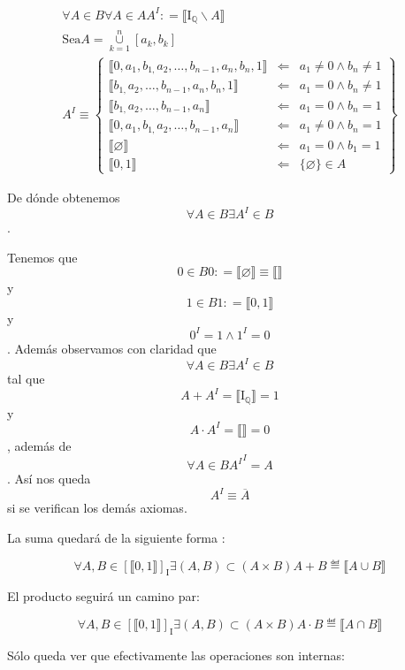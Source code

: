 \begin{enumerate}
  \[\begin{matrix}
  {\forall{A \in B}\forall{A \in A}A^{I}{: = {⟦{\mathbf{\mathrm{I}}_{\mathbb{Q}} \smallsetminus A}⟧}}} \\
  {\text{Sea}{A = \underset{k = 1}{\overset{n}{\cup}}}\left\lbrack {a_{k},b_{k}} \right\rbrack} \\
  {A^{I} \equiv \begin{Bmatrix}
  {⟦{{0,a_{1}},{b_{1,}a_{2}},\ldots,{b_{n - 1},a_{n}},{b_{n},1}}⟧} & \Leftarrow & {{a_{1} \neq {0 \land b_{n}}} \neq 1} \\
  {⟦{{b_{1,}a_{2}},\ldots,{b_{n - 1},a_{n}},{b_{n},1}}⟧} & \Leftarrow & {{a_{1} = {0 \land b_{n}}} \neq 1} \\
  {⟦{{b_{1,}a_{2}},\ldots,{b_{n - 1},a_{n}}}⟧} & \Leftarrow & {{a_{1} = {0 \land b_{n}}} = 1} \\
  {⟦{{0,a_{1}},{b_{1,}a_{2}},\ldots,{b_{n - 1},a_{n}}}⟧} & \Leftarrow & {{a_{1} \neq {0 \land b_{n}}} = 1} \\
  {⟦\varnothing ⟧} & \Leftarrow & {{a_{1} = {0 \land b_{1}}} = 1} \\
  {⟦0,1⟧} & \Leftarrow & {{\{\varnothing\}} \in A}
  \end{Bmatrix}}
  \end{matrix}\]

  De dónde obtenemos\[\forall{A \in B}\exists{A^{I} \in B}\].

  Tenemos que \[{0 \in B}0{{: = {⟦\varnothing ⟧}} \equiv {⟦⟧}}\]y
  \[{1 \in B}1{: = {⟦0,1⟧}}\]y \[{0^{I} = {1 \land 1^{I}}} = 0\]. Además
  observamos con claridad que
  \[\forall{A \in B}\exists{A^{I} \in B}\]tal
  que\[{{A + A^{I}} = {⟦\mathbf{\mathrm{I}}_{\mathbb{Q}}⟧}} = 1\]y
  \[{{A \cdot A^{I}} = {⟦⟧}} = 0\], además de
  \[\forall{A \in B}{{A^{I}}^{I} = A}\]. Así nos queda
  \[A^{I} \equiv \overline{A}\]si se verifican los demás axiomas.

  La suma quedará de la siguiente forma :

  \[\forall A,{B \in \left\lbrack {⟦0,1⟧} \right\rbrack_{\mathbf{\mathrm{I}}}}\exists{\left( {A,B} \right) \subset \left( {A \times B} \right)}{A + B} ≝ {⟦{A \cup B}⟧}\]

  El producto seguirá un camino par:

  \[\forall A,{B \in \left\lbrack {⟦0,1⟧} \right\rbrack_{\mathbf{\mathrm{I}}}}\exists{\left( {A,B} \right) \subset \left( {A \times B} \right)}{A \cdot B} ≝ {⟦{A \cap B}⟧}\]

  Sólo queda ver que efectivamente las operaciones son internas:


\end{enumerate}
